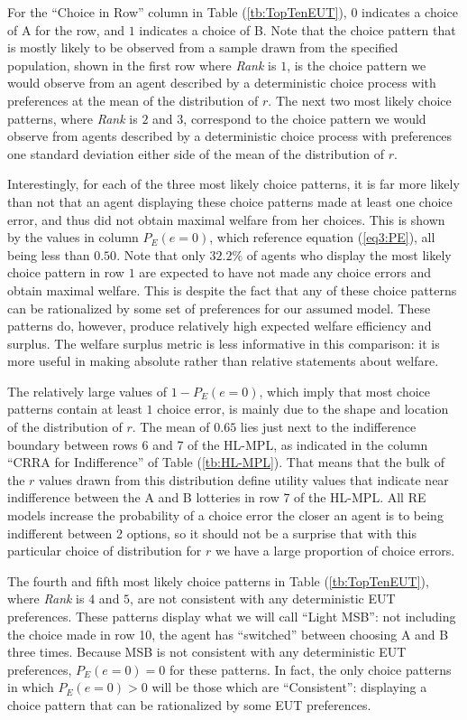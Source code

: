 \documentclass[../main.tex]{subfiles}
\begin{document}
For the \enquote{Choice in Row} column in Table (\ref{tb:TopTenEUT}), $0$ indicates a choice of A for the row, and $1$ indicates a choice of B.
Note that the choice pattern that is mostly likely to be observed from a sample drawn from the specified population, shown in the first row where \textit{Rank} is $1$, is the choice pattern we would observe from an agent described by a deterministic choice process with preferences at the mean of the distribution of $r$.
The next two most likely choice patterns, where \textit{Rank} is $2$ and $3$, correspond to the choice pattern we would observe from agents described by a deterministic choice process with preferences one standard deviation either side of the mean of the distribution of $r$.

Interestingly, for each of the three most likely choice patterns, it is far more likely than not that an agent displaying these choice patterns made at least one choice error, and thus did not obtain maximal welfare from her choices.
This is shown by the values in column $P_E(e=0)$, which reference equation (\ref{eq3:PE}), all being less than $0.50$.
Note that only $32.2\%$ of agents who display the most likely choice pattern in row $1$ are expected to have not made any choice errors and obtain maximal welfare.
This is despite the fact that any of these choice patterns can be rationalized by some set of preferences for our assumed model.
These patterns do, however, produce relatively high expected welfare efficiency and surplus.
The welfare surplus metric is less informative in this comparison: it is more useful in making absolute rather than relative statements about welfare.

The relatively large values of $ 1 - P_E(e = 0)$, which imply that most choice patterns contain at least $1$ choice error, is mainly due to the shape and location of the distribution of $r$.
The mean of $0.65$ lies just next to the indifference boundary between rows 6 and 7 of the HL-MPL, as indicated in the column \enquote{CRRA for Indifference} of Table (\ref{tb:HL-MPL}).
That means that the bulk of the $r$ values drawn from this distribution define utility values that indicate near indifference between the A and B lotteries in row 7 of the HL-MPL.
All RE models increase the probability of a choice error the closer an agent is to being indifferent between 2 options, so it should not be a surprise that with this particular choice of distribution for $r$ we have a large proportion of choice errors.

The fourth and fifth most likely choice patterns in Table (\ref{tb:TopTenEUT}), where \textit{Rank} is $4$ and $5$, are not consistent with any deterministic EUT preferences.
These patterns display what we will call \enquote{Light MSB}: not including the choice made in row 10, the agent has \enquote{switched} between choosing A and B three times.{\footnotemark}
Because MSB is not consistent with any deterministic EUT preferences, $P_E(e=0)=0$ for these patterns.
In fact, the only choice patterns in which $P_E(e=0)>0$ will be those which are \enquote{Consistent}: displaying a choice pattern that can be rationalized by some EUT preferences.
\end{document}
